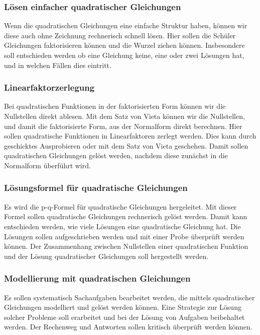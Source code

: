 \documentclass{article}
\begin{document}
\subsubsection*{Lösen einfacher quadratischer Gleichungen}
Wenn die quadratischen Gleichungen eine einfache Struktur haben, können wir diese auch ohne Zeichnung rechnerisch schnell lösen.
Hier sollen die Schüler Gleichungen faktorisieren können und die Wurzel ziehen können. Insbesondere soll entschieden werden ob eine Gleichung keine, eine oder zwei Lösungen hat, und in welchen Fällen dies eintritt.
\subsubsection*{Linearfaktorzerlegung}
Bei quadratischen Funktionen in der faktorisierten Form können wir die Nullstellen direkt ablesen.
Mit dem Satz von Vieta können wir die Nullstellen, und damit die faktorisierte Form, aus der Normalform direkt berechnen.
Hier sollen quadratische Funktionen in Linearfaktoren zerlegt werden. Dies kann durch geschicktes Ausprobieren oder mit dem Satz von Vieta geschehen.
Damit sollen quadratischen Gleichungen gelöst werden, nachdem  diese zunächst in die Normalform überführt wird.
\subsubsection*{Lösungsformel für quadratische Gleichungen}
Es wird die p-q-Formel für quadratische Gleichungen hergeleitet.
Mit dieser Formel sollen quadratische Gleichungen rechnerisch gelöst werden. 
Damit kann entschieden werden, wie viele Lösungen eine quadratische Gleichung hat.
Die Lösungen sollen aufgeschrieben werden und mit einer Probe überprüft werden können.
Der Zusammenhang zwischen Nullstellen einer quadratischen Funktion und der Lösung quadratischer Gleichungen soll hergestellt werden.
\subsubsection*{Modellierung mit quadratischen Gleichungen}
Es sollen systematisch Sachaufgaben bearbeitet werden, die mittels quadratischer Gleichungen modelliert und gelöst werden können.
Eine Strategie zur Lösung solcher Probleme soll erarbeitet und bei der Lösung von Aufgaben beibehaltet werden.
Der Rechenweg und Antworten sollen kritisch überprüft werden können. 
\newpage
\end{document}
